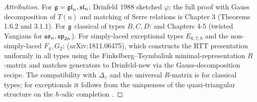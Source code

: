 \begin{proof}[Attribution]
For $\mathfrak{g} = \mathfrak{gl}_n, \mathfrak{sl}_n$: Drinfeld 1988 sketched $\varphi$; the
full proof with Gauss decomposition of $T(u)$ and matching of Serre
relations is \cite{Molev07} Chapter 3 (Theorems 1.6.2 and 3.1.1). For
$\mathfrak{g}$ classical of types $B, C, D$: \cite{AMR06} and \cite{Molev07}
Chapters 4-5 (twisted Yangians for $\mathfrak{so}_n, \mathfrak{sp}_{2n}$). For simply-laced
exceptional types $E_{6,7,8}$ and the non-simply-laced $F_4, G_2$:
\cite{GuayRegelskisWendlandt18} (arXiv:1811.06475), which
constructs the RTT presentation uniformly in all types using the
Finkelberg--Tsymbaliuk minimal-representation $R$-matrix and matches
generators to Drinfeld-new via the Gauss-decomposition recipe. The
compatibility with $\Delta_z$ and the universal $R$-matrix is
\cite{KhoroshkinTolstoy96} for classical types; for exceptionals it
follows from the uniqueness of the quasi-triangular structure on the
$\hbar$-adic completion \cite{Drinfeld89}. \qedhere
\end{proof}

